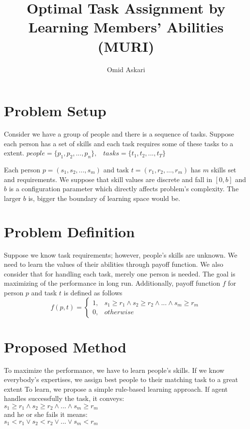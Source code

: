 \documentclass[]{article}
\title{Optimal Task Assignment by Learning Members' Abilities (MURI)}
\author{Omid Askari}
\begin{document}
\maketitle
\linenumbers
\setpagewiselinenumbers

\section{Problem Setup}
Consider we have a group of people and there is a sequence of tasks. Suppose each person has a set of skills and each task requires some of these tasks to a extent.\newline
$people = \{p_1, p_2, ..., p_n\}, \;\;\;    
tasks = \{t_1, t_2, ..., t_T\}$

Each person $p=(s_1, s_2, ..., s_m)$ and task $t=(r_1, r_2 , ..., r_m)$ has $m$ skills set and requirements. We suppose that skill values are discrete and fall in $[0, b]$ and $b$ is a configuration parameter which directly affects problem's complexity. The larger $b$ is, bigger the boundary of learning space would be. 

\section{Problem Definition}
Suppose we know task requirements; however, people's skills are unknown. We need to learn the values of their abilities through payoff function. We also consider that for handling each task, merely one person is needed. The goal is maximizing of the performance in long run.
Additionally, payoff function $f$ for person $p$ and task $t$ is defined as follows
\begin{equation}
	f(p,t) = 
	\begin{cases}
		1,	& s_1 \geq r_1 \wedge s_2 \geq r_2 \wedge ... \wedge s_m \geq r_m\\
		0,	& otherwise
	\end{cases}
\end{equation}

\section{Proposed Method}
To maximize the performance, we have to learn people's skills. If we know everybody's expertises, we assign best people to their matching task to a great extent
To learn, we propose a simple rule-based learning approach. If agent handles successfully the task, it conveys:\\
$s_1 \geq r_1 \wedge s_2 \geq r_2 \wedge ... \wedge s_m \geq r_m$\\
and he or she fails it means:\\
$s_1 < r_1 \vee s_2 < r_2 \vee ... \vee s_m < r_m$
\end{document}

